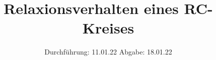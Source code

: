 

\subject{V353}
\title{Relaxionsverhalten eines RC-Kreises}
\date{
  Durchführung: 11.01.22
  \hspace{3em}
  Abgabe: 18.01.22
}



\maketitle
\thispagestyle{empty}
\tableofcontents
\newpage








\newpage
\printbibliography{}
\nocite{matplotlib}
\nocite{numpy}
\nocite{uncertainties}
\nocite{reback2020pandas}


